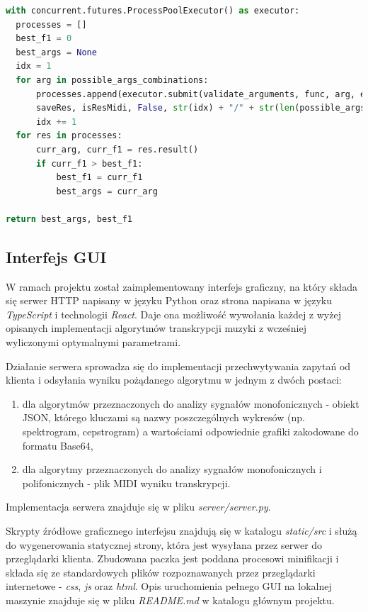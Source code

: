 \documentclass[12pt,a4paper,twoside]{mwart}
\begin{document}
\begin{lstlisting}[language=Python, caption={Algorytm szukający najlepszej kombinacji argumentów dla zadanej funkcji func.}, captionpos=b, label={code:eval:multiproces}, numbers=none]
with concurrent.futures.ProcessPoolExecutor() as executor:
  processes = []
  best_f1 = 0
  best_args = None
  idx = 1
  for arg in possible_args_combinations:
      processes.append(executor.submit(validate_arguments, func, arg, evalObjects,\
      saveRes, isResMidi, False, str(idx) + "/" + str(len(possible_args_combinations))))
      idx += 1
  for res in processes:
      curr_arg, curr_f1 = res.result()
      if curr_f1 > best_f1:
          best_f1 = curr_f1
          best_args = curr_arg

return best_args, best_f1
\end{lstlisting}

\subsection{Interfejs GUI}\label{sec:impl:gui}
W ramach projektu został zaimplementowany interfejs graficzny, na który składa się serwer HTTP napisany w języku Python oraz strona napisana w języku \textit{TypeScript} i technologii \textit{React}. Daje ona możliwość wywołania każdej z wyżej opisanych implementacji algorytmów transkrypcji muzyki z wcześniej wyliczonymi optymalnymi parametrami.

Działanie serwera sprowadza się do implementacji przechwytywania zapytań od klienta i odsyłania wyniku pożądanego algorytmu w jednym z dwóch postaci:
\begin{enumerate}
  \item dla algorytmów przeznaczonych do analizy sygnałów monofonicznych - obiekt JSON, którego kluczami są nazwy poszczególnych wykresów (np. spektrogram, cepstrogram) a wartościami odpowiednie grafiki zakodowane do formatu Base64,
  \item dla algorytmy przeznaczonych do analizy sygnałów monofonicznych i polifonicznych - plik MIDI wyniku transkrypcji.
\end{enumerate} 
Implementacja serwera znajduje się w pliku \textit{server/server.py}.

Skrypty źródłowe graficznego interfejsu znajdują się w katalogu \textit{static/src} i służą do wygenerowania statycznej strony, która jest wysyłana przez serwer do przeglądarki klienta. Zbudowana paczka jest poddana procesowi minifikacji i składa się ze standardowych plików rozpoznawanych przez przeglądarki internetowe - \textit{css}, \textit{js} oraz \textit{html}. Opis uruchomienia pełnego GUI na lokalnej maszynie znajduje się w pliku \textit{README.md} w katalogu głównym projektu.
\end{document}
